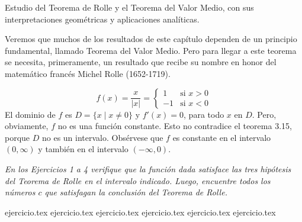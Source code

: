 
Estudio del Teorema de Rolle y el Teorema del Valor Medio, con sus interpretaciones geométricas y aplicaciones analíticas.

Veremos que muchos de los resultados de este capítulo dependen de un principio fundamental, llamado Teorema del Valor Medio. Pero para llegar a este teorema se necesita, primeramente, un resultado que recibe su nombre en honor del matemático francés Michel Rolle (1652-1719).

\vspace{1em}
\begin{center}
\end{center}

\vspace{1em}
\noindent
$$f(x) = \frac{x}{|x|} = \begin{cases} 
1 & \text{si } x > 0 \\ 
-1 & \text{si } x < 0 
\end{cases}$$
El dominio de $f$ es $D = \{x \mid x \ne 0\}$ y $f'(x) = 0$, para todo $x$ en $D$. Pero, obviamente, $f$ no es una función constante. Esto no contradice el teorema 3.15, porque $D$ no es un intervalo. Obsérvese que $f$ es constante en el intervalo $(0, \infty)$ y también en el intervalo $(-\infty, 0)$.

\vspace{1.5em}
\noindent \textit{En los Ejercicios 1 a 4 verifique que la función dada satisface las tres hipótesis del Teorema de Rolle en el intervalo indicado. Luego, encuentre todos los números $c$ que satisfagan la conclusión del Teorema de Rolle.}

\begin{enumerate}
    {ejercicio.tex}
    {ejercicio.tex}
    {ejercicio.tex}
    {ejercicio.tex}
    {ejercicio.tex}
    {ejercicio.tex}
\end{enumerate}

